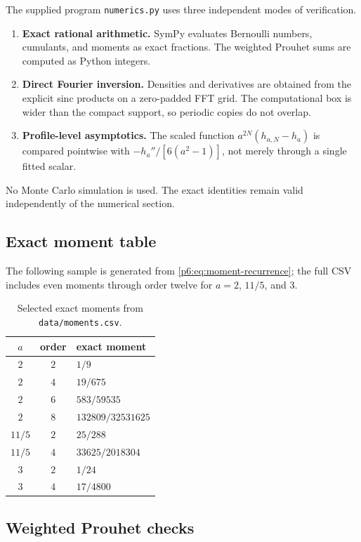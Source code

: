 \documentclass[11pt,oneside]{article}
\numberwithin{equation}{section}
\theoremstyle{definition}
\theoremstyle{remark}
\begin{document}
The supplied program \texttt{numerics.py} uses three independent modes of
verification.
\begin{enumerate}
\item \textbf{Exact rational arithmetic.}  SymPy evaluates Bernoulli numbers,
cumulants, and moments as exact fractions.  The weighted Prouhet sums are
computed as Python integers.
\item \textbf{Direct Fourier inversion.}  Densities and derivatives are obtained
from the explicit sinc products on a zero-padded FFT grid.  The computational
box is wider than the compact support, so periodic copies do not overlap.
\item \textbf{Profile-level asymptotics.}  The scaled function
$a^{2N}(h_{a,N}-h_a)$ is compared pointwise with
$-h_a''/[6(a^2-1)]$, not merely through a single fitted scalar.
\end{enumerate}
No Monte Carlo simulation is used.  The exact identities remain valid
independently of the numerical section.

\subsection{Exact moment table}

The following sample is generated from \eqref{p6:eq:moment-recurrence}; the full
CSV includes even moments through order twelve for $a=2$, $11/5$, and $3$.
\begin{table}[H]
\centering
\small
\begin{tabular}{@{}ccl@{}}
\toprule
$a$ & order & exact moment \\
\midrule
$2$ & $2$ & $1/9$ \\
$2$ & $4$ & $19/675$ \\
$2$ & $6$ & $583/59535$ \\
$2$ & $8$ & $132809/32531625$ \\
$11/5$ & $2$ & $25/288$ \\
$11/5$ & $4$ & $33625/2018304$ \\
$3$ & $2$ & $1/24$ \\
$3$ & $4$ & $17/4800$ \\
\bottomrule
\end{tabular}
\caption{Selected exact moments from \texttt{data/moments.csv}.}
\label{p6:tab:moments}
\end{table}

\subsection{Weighted Prouhet checks}
\end{document}
